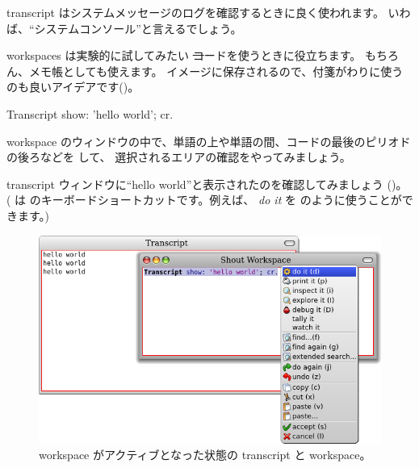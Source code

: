 \documentclass[a4paper,10pt,twoside]{book}
\begin{document}
transcript はシステムメッセージのログを確認するときに良く使われます。
いわば、``システムコンソール''と言えるでしょう。

workspaces は実験的に試してみたい \st コードを使うときに役立ちます。
もちろん、メモ帳としても使えます。
イメージに保存されるので、付箋がわりに使うのも良いアイデアです()。

\begin{code}{}
Transcript show: 'hello world'; cr.
\end{code}

workspace のウィンドウの中で、単語の上や単語の間、コードの最後のピリオドの後ろなどを \click して、
選択されるエリアの確認をやってみましょう。

transcript ウィンドウに``hello world''と表示されたのを確認してみましょう
()。
( は  のキーボードショートカットです。例えば、 \emph{do it} を  のように使うことができます。)

\begin{figure}[htb]
\centerline {\includegraphics[width=\textwidth]{HelloWorld}}
\caption{workspace がアクティブとなった状態の transcript と workspace。}
\end{figure}

\end{document}
